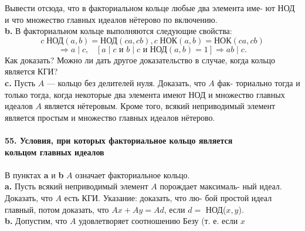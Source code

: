 \noindent Вывести отсюда, что в факториальном кольце любые два элемента име-\linebreak
ют НОД и что множество главных идеалов нётерово по включению.\\
\hspace*{10pt}\textbf{b.}  В факториальном кольце выполняются следующие свойства:
\begin{equation*}
c\;\text{НОД}(a,b)=\text{НОД}(ca, cb), c\;\text{НОК}(a,b)=\text{НОК}(ca, cb)
\end{equation*}
\begin{equation*}
[a\;|\;bc \text{ и НОД}(a,b)=1]\Rightarrow a\;|\;c,\;\;\;[a\;|\;c \text{ и }b\;|\;c \text{ и НОД}(a,b)=1]\Rightarrow ab\;|\;c.
\end{equation*}
\noindent 
Как доказать? Можно ли дать другое доказательство в случае, когда\linebreak
кольцо является КГИ?
\\
\hspace*{10pt}\textbf{c.} Пусть $A$ — кольцо без делителей нуля. Доказать, что $A$ фак-\linebreak
ториально тогда и только тогда, когда некоторые два элемента имеют\linebreak
НОД и множество главных идеалов $A$ является нётеровым. Кроме того,\linebreak
всякий неприводимый элемент является простым и множество главных\linebreak
идеалов нётерово.
\\
\\
\noindent\textbf{55. Условия, при которых факториальное кольцо является\\
кольцом главных идеалов}\\\\
\hspace*{10pt} В пунктах \textbf{a} и \textbf{b} $A$ означает факториальное кольцо.\\
\hspace*{10pt}\textbf{a.} Пусть всякий неприводимый элемент $A$ порождает максималь-\linebreak
ный идеал. Доказать, что $A$ есть КГИ. Указание: доказать, что лю-\linebreak
бой простой идеал главный, потом доказать, что $Ax+Ay=Ad$, если\linebreak
$d=$ НОД($x,y$).
\\
\hspace*{10pt}\textbf{b.} Допустим, что $A$ удовлетворяет соотношению Безу (т. е. если $x$\linebreak
